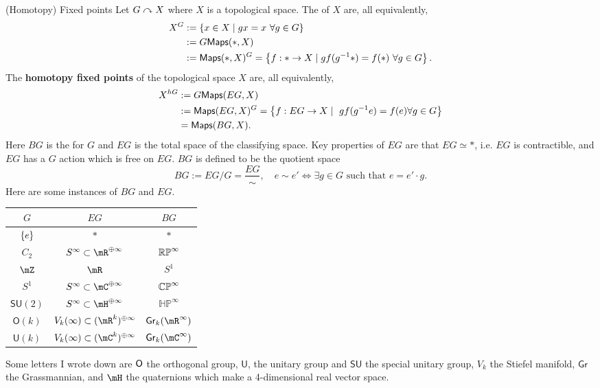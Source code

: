 \newpage
\begin{definition}{(Homotopy) Fixed points}{}
    Let $G\curvearrowright X$ where $X$ is a topological space. The  of $X$ are, all equivalently, \begin{align*}
      X^G&:=\left\{ x\in X\mid gx = x~\forall g\in G \right\}\\
      &:=G\mathsf{Maps}(\ast,X)\\
      &:=\mathsf{Maps}(\ast,X)^G = \left\{ f:\ast\to X\mid gf(g^{-1} \ast) = f(\ast)~\forall g\in G \right\}.
    \end{align*}
    The \textbf{homotopy fixed points} of the topological space $X$ are, all equivalently, 
    \begin{align*}
      X^{hG}&:=G\mathsf{Maps}(EG,X)\\
      &:=\mathsf{Maps}(EG,X)^G = \left\{ f:EG\to X\mid ~gf(g^{-1} e) = f(e)\forall g\in G \right\}\\
      & = \mathsf{Maps}(BG,X).
    \end{align*}
    Here $BG$ is the  for $G$ and $EG$ is the total space of the classifying space. Key properties of $EG$ are that $EG\simeq \ast$, i.e. $EG$ is contractible, and $EG$ has a $G$ action which is free on $EG$. $BG$ is defined to be the quotient space $$BG:=EG/G = \frac{EG}{\sim},\quad e\sim e'\iff \exists g\in G\text{ such that }e = e'\cdot g.$$ Here are some instances of $BG$ and $EG$. 
    \begin{center}
      \begin{tabular}{c|c|c}
        $G$ & $EG$ & $BG$\\\hline
        $\left\{ e \right\}$ & $\ast$ & $\ast$ \\ 
        $C_2$  & $S^{\infty}\subset \mR^{\oplus \infty}$ & $\mathbb{RP}^\infty$ \\ 
        $\mZ$ & $\mR$ & $S^1$\\
        $S^1$ & $S^\infty \subset \mC^{\oplus \infty}$ & $\mathbb{CP}^\infty$\\
        $\mathsf{SU}(2)$ & $S^\infty\subset\mH^{\oplus \infty}$ & $\mathbb{HP}^\infty$\\
        $\mathsf{O}(k)$ & $V_k(\infty)\subset (\mR^k)^{\oplus \infty}$ & $\mathsf{Gr}_k(\mR^\infty)$\\
        $\mathsf{U}(k)$ & $V_k(\infty)\subset (\mC^k)^{\oplus \infty}$ & $\mathsf{Gr}_k(\mC^\infty)$
      \end{tabular}
    \end{center}
    Some letters I wrote down are $\mathsf{O}$ the orthogonal group, $\mathsf{U}$, the unitary group and $\mathsf{SU}$ the special unitary group, $V_k$ the Stiefel manifold, $\mathsf{Gr}$ the Grassmannian, and $\mH$ the quaternions which make a 4-dimensional real vector space. 
\end{definition}